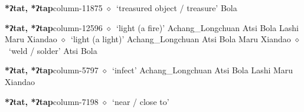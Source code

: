   \item {\footnotesize \textbf{*ʔtat, *ʔtap}}{\tiny column-11875}
         $\diamond$~`treasured object / treasure'
         Bola 
  \item {\footnotesize \textbf{*ʔtat, *ʔtap}}{\tiny column-12596}
         $\diamond$~`light (a fire)'
         Achang\_Longchuan 
\hspace{1ex}
         Atsi 
\hspace{1ex}
         Bola 
\hspace{1ex}
         Lashi 
\hspace{1ex}
         Maru 
\hspace{1ex}
         Xiandao 
\hspace{1ex}
         $\diamond$~`light (a light)'
         Achang\_Longchuan 
\hspace{1ex}
         Atsi 
\hspace{1ex}
         Bola 
\hspace{1ex}
         Maru 
\hspace{1ex}
         Xiandao 
\hspace{1ex}
         $\diamond$~`weld / solder'
         Atsi 
\hspace{1ex}
         Bola 
  \item {\footnotesize \textbf{*ʔtat, *ʔtap}}{\tiny column-5797}
         $\diamond$~`infect'
         Achang\_Longchuan 
\hspace{1ex}
         Atsi 
\hspace{1ex}
         Bola 
\hspace{1ex}
         Lashi 
\hspace{1ex}
         Maru 
\hspace{1ex}
         Xiandao 
  \item {\footnotesize \textbf{*ʔtat, *ʔtap}}{\tiny column-7198}
         $\diamond$~`near / close to'
